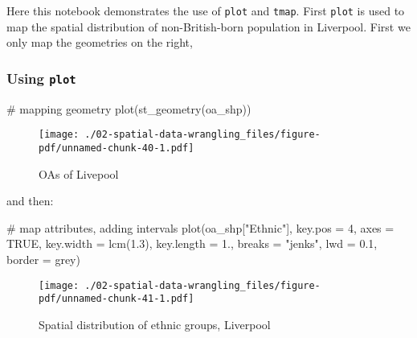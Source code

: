 \documentclass[
  letterpaper,
  krantz2]{style/krantz}
\newenvironment{Shaded}{\begin{snugshade}}{\end{snugshade}}
\newcommand{\AttributeTok}[1]{\textcolor[rgb]{0.40,0.45,0.13}{#1}}
\newcommand{\CommentTok}[1]{\textcolor[rgb]{0.37,0.37,0.37}{#1}}
\newcommand{\ConstantTok}[1]{\textcolor[rgb]{0.56,0.35,0.01}{#1}}
\newcommand{\DecValTok}[1]{\textcolor[rgb]{0.68,0.00,0.00}{#1}}
\newcommand{\FloatTok}[1]{\textcolor[rgb]{0.68,0.00,0.00}{#1}}
\newcommand{\FunctionTok}[1]{\textcolor[rgb]{0.28,0.35,0.67}{#1}}
\newcommand{\NormalTok}[1]{\textcolor[rgb]{0.00,0.23,0.31}{#1}}
\newcommand{\StringTok}[1]{\textcolor[rgb]{0.13,0.47,0.30}{#1}}
\begin{document}
Here this notebook demonstrates the use of \texttt{plot} and
\texttt{tmap}. First \texttt{plot} is used to map the spatial
distribution of non-British-born population in Liverpool. First we only
map the geometries on the right,

\hypertarget{using-plot}{%
\subsubsection{\texorpdfstring{Using
\texttt{plot}}{Using plot}}\label{using-plot}}

\begin{Shaded}
\begin{Highlighting}[]
\CommentTok{\# mapping geometry}
\FunctionTok{plot}\NormalTok{(}\FunctionTok{st\_geometry}\NormalTok{(oa\_shp))}
\end{Highlighting}
\end{Shaded}

\begin{figure}[H]

{\centering \texttt{[image: ./02-spatial-data-wrangling\_files/figure-pdf/unnamed-chunk-40-1.pdf]}

}

\caption{OAs of Livepool}

\end{figure}

and then:

\begin{Shaded}
\begin{Highlighting}[]
\CommentTok{\# map attributes, adding intervals}
\FunctionTok{plot}\NormalTok{(oa\_shp[}\StringTok{"Ethnic"}\NormalTok{], }\AttributeTok{key.pos =} \DecValTok{4}\NormalTok{, }\AttributeTok{axes =} \ConstantTok{TRUE}\NormalTok{, }\AttributeTok{key.width =} \FunctionTok{lcm}\NormalTok{(}\FloatTok{1.3}\NormalTok{), }\AttributeTok{key.length =} \FloatTok{1.}\NormalTok{,}
     \AttributeTok{breaks =} \StringTok{"jenks"}\NormalTok{, }\AttributeTok{lwd =} \FloatTok{0.1}\NormalTok{, }\AttributeTok{border =} \StringTok{\textquotesingle{}grey\textquotesingle{}}\NormalTok{) }
\end{Highlighting}
\end{Shaded}

\begin{figure}[H]

{\centering \texttt{[image: ./02-spatial-data-wrangling\_files/figure-pdf/unnamed-chunk-41-1.pdf]}

}

\caption{Spatial distribution of ethnic groups, Liverpool}

\end{figure}
\end{document}
